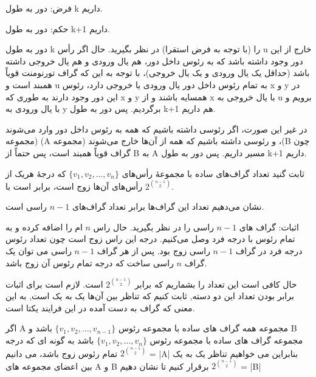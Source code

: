 \documentclass[11pt,largemargins]{h2wp}
\begin{document}
    فرض: دور به طول k داریم.
    
    حکم: دور به طول k+1 داریم.
    
    دور به طول k را (با توجه به فرض استقرا) در نظر بگیرید. حال اگر رأس u خارج از این دور وجود داشته باشد که به رئوس داخل دور، هم یال ورودی و هم یال خروجی داشته باشد (حداقل یک یال ورودی و یک یال خروجی)، با توجه به این که گراف تورنومنت قویاً همبند است و u به تمام رئوس داخل دور یال ورودی یا خروجی دارد، رئوس x و y در این دور وجود دارند به طوری که x و y همسایه باشند و از x با یال خروجی به u برویم و با یال ورودی به y برگردیم. پس دور به طول k+1 هم داریم.
    
    در غیر این صورت، اگر رئوسی داشته باشیم که همه به رئوس داخل دور وارد می‌شوند (مجموعه (A و رئوسی داشته باشیم که همه از آن‌ها خارج می‌شوند (مجموعه ،(B چون گراف قویاً همبند است، پس حتماً از B به  A مسیر داریم. پس دور به طول k+1 داریم.
    
   
   


    \question

    ثابت گنید تعداد گراف‌های ساده با مجموعهٔ رأس‌های $\{v_{1}, v_{2}, \dots, v_{n}\}$  که درجهٔ هریک از رأس‌های آن‌ها زوج است، برابر است با $2^{{n-1}\choose{2}}$.
   
\solution
 نشان می‌دهیم تعداد این گراف‌ها برابر تعداد گراف‌های 
$n-1$ 
 راسی است.
 
 اثبات: گراف های 
 $n-1$ 
 راسی را در نظر بگیرید. حال راس 
 $n$ 
 ام را اضافه کرده و به تمام رئوس با درجه فرد وصل می‌کنیم.
 درجه این راس زوج است چون تعداد رئوس درجه فرد در گراف 
 $n-1$ 
 راسی زوج بود.
 پس از هر گراف 
 $n-1$ 
 راسی می توان یک گراف 
 $n$ 
 راسی ساخت که درجه تمام رئوس آن زوج باشد.
 
 حال کافی است این تعداد را بشماریم که برابر
 $2^{{n-1}\choose{2}}$
 است.
  \Enote
  لازم است برای اثبات برابر بودن تعداد این دو دسته, ثابت کنیم که تناظر بین آن‌ها یک به یک است, به این معنی که گراف به دست آمده در این فرایند یکتا است.
 
  اگر A مجموعه همه گراف های ساده با مجموعه رئوس $\{v_{1}, v_{2}, \dots, v_{n-1}\}$ باشد و B مجموعه گراف های ساده با مجموعه رئوس $\{v_{1}, v_{2}, \dots, v_{n}\}$ باشد به گونه ای که درجه تمام رئوس زوج باشد،   
    می دانیم $2^{{n-1}\choose{2}}$ = |A|
    بنابراین می خواهیم تناظر یک به یک بین اعضای مجموعه های A و B برقرار کنیم تا نشان دهیم
    $2^{{n-1}\choose{2}}$ = |B|
    
\end{document}
